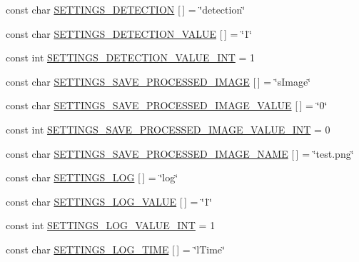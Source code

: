 \begin{DoxyCompactItemize}
\item 
const char \mbox{\hyperlink{namespaceyenot_a6a7294929420d7790b72f733c98bcf56}{S\+E\+T\+T\+I\+N\+G\+S\+\_\+\+D\+E\+T\+E\+C\+T\+I\+ON}} \mbox{[}$\,$\mbox{]} = \char`\"{}detection\char`\"{}
\item 
const char \mbox{\hyperlink{namespaceyenot_a7d631c2848347b1df2d133225075ced0}{S\+E\+T\+T\+I\+N\+G\+S\+\_\+\+D\+E\+T\+E\+C\+T\+I\+O\+N\+\_\+\+V\+A\+L\+UE}} \mbox{[}$\,$\mbox{]} = \char`\"{}1\char`\"{}
\item 
const int \mbox{\hyperlink{namespaceyenot_a3043cfcdd8cc01993a692d71244049f6}{S\+E\+T\+T\+I\+N\+G\+S\+\_\+\+D\+E\+T\+E\+C\+T\+I\+O\+N\+\_\+\+V\+A\+L\+U\+E\+\_\+\+I\+NT}} = 1
\item 
const char \mbox{\hyperlink{namespaceyenot_a68308c1bd5623fffdc0992da59a687b3}{S\+E\+T\+T\+I\+N\+G\+S\+\_\+\+S\+A\+V\+E\+\_\+\+P\+R\+O\+C\+E\+S\+S\+E\+D\+\_\+\+I\+M\+A\+GE}} \mbox{[}$\,$\mbox{]} = \char`\"{}s\+Image\char`\"{}
\item 
const char \mbox{\hyperlink{namespaceyenot_a2e3ae4b394042b1c4cbc4ae56a4af012}{S\+E\+T\+T\+I\+N\+G\+S\+\_\+\+S\+A\+V\+E\+\_\+\+P\+R\+O\+C\+E\+S\+S\+E\+D\+\_\+\+I\+M\+A\+G\+E\+\_\+\+V\+A\+L\+UE}} \mbox{[}$\,$\mbox{]} = \char`\"{}0\char`\"{}
\item 
const int \mbox{\hyperlink{namespaceyenot_a58502c9277df0f0d680ddc344e5cea3e}{S\+E\+T\+T\+I\+N\+G\+S\+\_\+\+S\+A\+V\+E\+\_\+\+P\+R\+O\+C\+E\+S\+S\+E\+D\+\_\+\+I\+M\+A\+G\+E\+\_\+\+V\+A\+L\+U\+E\+\_\+\+I\+NT}} = 0
\item 
const char \mbox{\hyperlink{namespaceyenot_a6703c9900f97a42185c36c74c4147be3}{S\+E\+T\+T\+I\+N\+G\+S\+\_\+\+S\+A\+V\+E\+\_\+\+P\+R\+O\+C\+E\+S\+S\+E\+D\+\_\+\+I\+M\+A\+G\+E\+\_\+\+N\+A\+ME}} \mbox{[}$\,$\mbox{]} = \char`\"{}test.\+png\char`\"{}
\item 
const char \mbox{\hyperlink{namespaceyenot_a353e320b6fbef3dc210fd42ad10ff83c}{S\+E\+T\+T\+I\+N\+G\+S\+\_\+\+L\+OG}} \mbox{[}$\,$\mbox{]} = \char`\"{}log\char`\"{}
\item 
const char \mbox{\hyperlink{namespaceyenot_ab2eea8a981ab7baa7755cc64508671a0}{S\+E\+T\+T\+I\+N\+G\+S\+\_\+\+L\+O\+G\+\_\+\+V\+A\+L\+UE}} \mbox{[}$\,$\mbox{]} = \char`\"{}1\char`\"{}
\item 
const int \mbox{\hyperlink{namespaceyenot_ab756a3a6fb449bd27e6674cdf402b4d1}{S\+E\+T\+T\+I\+N\+G\+S\+\_\+\+L\+O\+G\+\_\+\+V\+A\+L\+U\+E\+\_\+\+I\+NT}} = 1
\item 
const char \mbox{\hyperlink{namespaceyenot_a420dc7e6e8223c7cd5ec7127995d46a0}{S\+E\+T\+T\+I\+N\+G\+S\+\_\+\+L\+O\+G\+\_\+\+T\+I\+ME}} \mbox{[}$\,$\mbox{]} = \char`\"{}l\+Time\char`\"{}

\end{DoxyCompactItemize}
